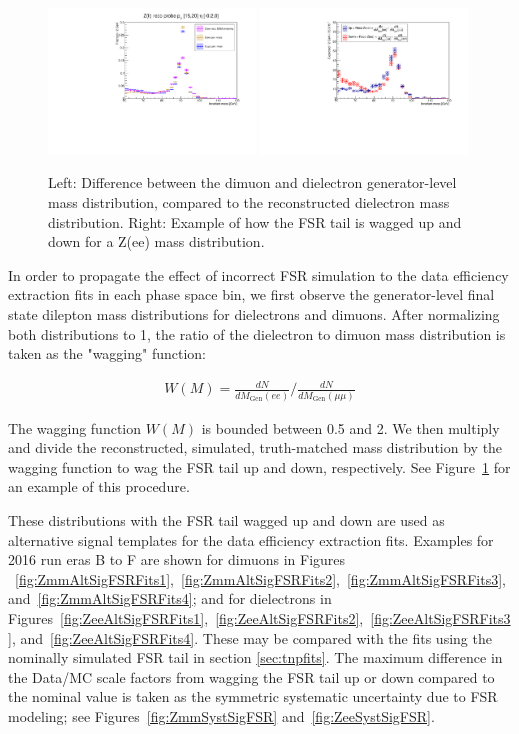 \begin{figure}
\centering
\includegraphics[width=0.49\textwidth]{figures/genTemplatesPlot.pdf}
\includegraphics[width=0.49\textwidth]{figures/genTemplatesPlot2.pdf}
\caption{Left: Difference between the dimuon and dielectron generator-level mass distribution, compared to the reconstructed dielectron mass distribution. Right: Example of how the FSR tail is wagged up and down for a Z(ee) mass distribution.}
\label{fig:ExampleFsrWagging}
\end{figure}

In order to propagate the effect of incorrect FSR simulation to the data efficiency extraction fits
in each phase space bin, we first observe the generator-level final state
dilepton mass distributions for dielectrons and dimuons.
After normalizing both distributions to 1, the ratio of the dielectron to dimuon mass distribution 
is taken as the "wagging" function:

\begin{align*}
  W(M) = \frac{dN}{dM_{\mathrm{Gen}}(ee)} / \frac{dN}{dM_{\mathrm{Gen}}(\mu\mu)}
\end{align*}

The wagging function $W(M)$ is bounded between 0.5 and 2.
We then multiply and divide the reconstructed, simulated, truth-matched mass distribution
by the wagging function to wag the FSR tail up and down, respectively.
See Figure~\ref{fig:ExampleFsrWagging} for an example of this procedure.

These distributions with the FSR tail wagged up and down are used as alternative signal templates
for the data efficiency extraction fits. Examples for 2016 run eras B to F are shown for dimuons in
Figures ~\ref{fig:ZmmAltSigFSRFits1},~\ref{fig:ZmmAltSigFSRFits2},~\ref{fig:ZmmAltSigFSRFits3}, and~\ref{fig:ZmmAltSigFSRFits4};
and for dielectrons in Figures~\ref{fig:ZeeAltSigFSRFits1},~\ref{fig:ZeeAltSigFSRFits2},~\ref{fig:ZeeAltSigFSRFits3}, and~\ref{fig:ZeeAltSigFSRFits4}.
These may be compared with the fits using the nominally simulated FSR tail
in section \ref{sec:tnpfits}.
The maximum difference in the Data/MC scale factors from wagging the FSR tail up or down compared to the nominal value
is taken as the symmetric systematic uncertainty due to FSR modeling;
see Figures~\ref{fig:ZmmSystSigFSR} and~\ref{fig:ZeeSystSigFSR}.

